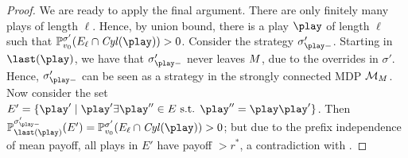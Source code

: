 \begin{proof}
 We are ready to apply the final argument. There are only finitely many plays of length $ \ell $. Hence, by union bound, there is a play $ \play $ of length $ \ell $ such that $\probm_{\vinit}^{\sigma'}(E_\ell \cap \cylinder(\play))>0$. Consider the strategy  $\slice{\sigma'}{\play}$. 
 Starting in $ \last(\play) $, we have that $\slice{\sigma'}{\play}$ never leaves $ M $, due to the overrides in $ \sigma' $. Hence, $\slice{\sigma'}{\play}$ can be seen as a strategy in the strongly connected MDP $ \mathcal{M}_M $. Now consider the set $ E'=\{\play'\mid \play'\exists\play''\in E \text{ s.t. } \play''=\play\play'\} $. Then $ \probm_{\last(\play)}^{\slice{\sigma'}{\play}}(E') = \probm_{\vinit}^{\sigma'}(E_\ell \cap \cylinder(\play))>0 $; but due to the prefix independence of mean payoff, all plays in $ E' $ have payoff $ > r^* $, a contradiction with .
% 
% 
%
%

\end{proof}
